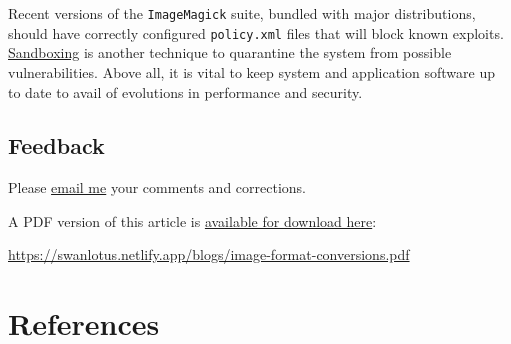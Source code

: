 \documentclass[
  a4paper,
]{article}
\begin{document}
Recent versions of the \texttt{ImageMagick} suite, bundled with major
distributions, should have correctly configured \texttt{policy.xml}
files that will block known exploits.
\href{https://www.techopedia.com/definition/25266/sandboxing}{Sandboxing}
is another technique to quarantine the system from possible
vulnerabilities. Above all, it is vital to keep system and application
software up to date to avail of evolutions in performance and security.

\hypertarget{feedback}{%
\subsection{Feedback}\label{feedback}}

Please \href{mailto:feedback.swanlotus@gmail.com}{email me} your
comments and corrections.

\noindent A PDF version of this article is
\href{image-format-conversions.pdf}{available for download here}:

\begin{small}

\begin{sffamily}

\url{https://swanlotus.netlify.app/blogs/image-format-conversions.pdf}

\end{sffamily}

\end{small}

\hypertarget{bibliography}{%
\section*{References}\label{bibliography}}
\end{document}
